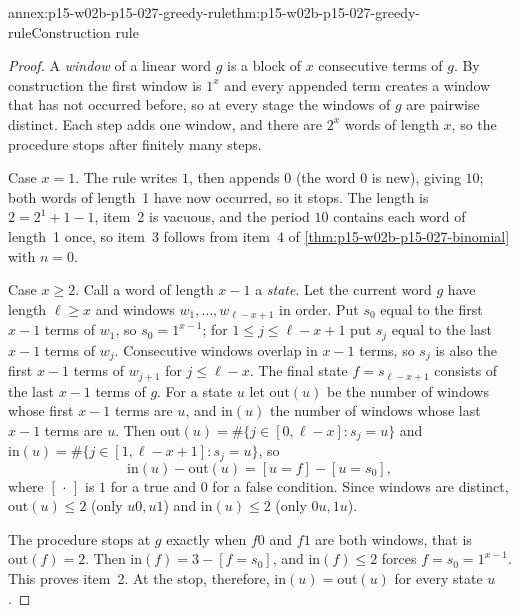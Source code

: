 \begin{annexitem}{annex:p15-w02b-p15-027-greedy-rule}{thm:p15-w02b-p15-027-greedy-rule}{Construction rule}
\begin{proof}
A \emph{window} of a linear word \(g\) is a block of \(x\) consecutive
terms of \(g\). By construction the first window is \(1^x\) and every
appended term creates a window that has not occurred before, so at every
stage the windows of \(g\) are pairwise distinct. Each step adds one
window, and there are \(2^x\) words of length \(x\), so the procedure
stops after finitely many steps.

Case \(x=1\). The rule writes \(1\), then appends \(0\) (the word \(0\)
is new), giving \(10\); both words of length~1 have now occurred, so it
stops. The length is \(2=2^1+1-1\), item~2 is vacuous, and the period
\(10\) contains each word of length~1 once, so item~3 follows from
item~4 of \cref{thm:p15-w02b-p15-027-binomial} with \(n=0\).

Case \(x\geq2\). Call a word of length \(x-1\) a \emph{state}. Let the
current word \(g\) have length \(\ell\geq x\) and windows
\(w_1,\ldots,w_{\ell-x+1}\) in order. Put \(s_0\) equal to the first
\(x-1\) terms of \(w_1\), so \(s_0=1^{x-1}\); for
\(1\leq j\leq\ell-x+1\) put \(s_j\) equal to the last \(x-1\) terms of
\(w_j\). Consecutive windows overlap in \(x-1\) terms, so \(s_j\) is
also the first \(x-1\) terms of \(w_{j+1}\) for \(j\leq\ell-x\). The
final state \(f=s_{\ell-x+1}\) consists of the last \(x-1\) terms of
\(g\). For a state \(u\) let \(\mathrm{out}(u)\) be the number of windows
whose first \(x-1\) terms are \(u\), and \(\mathrm{in}(u)\) the number of
windows whose last \(x-1\) terms are \(u\). Then
\(\mathrm{out}(u)=\#\{j\in[0,\ell-x]:s_j=u\}\) and
\(\mathrm{in}(u)=\#\{j\in[1,\ell-x+1]:s_j=u\}\), so
\[
 \mathrm{in}(u)-\mathrm{out}(u)=[u=f]-[u=s_0],
\]
where \([\,\cdot\,]\) is \(1\) for a true and \(0\) for a false condition.
Since windows are distinct, \(\mathrm{out}(u)\leq2\) (only \(u0,u1\)) and
\(\mathrm{in}(u)\leq2\) (only \(0u,1u\)).

The procedure stops at \(g\) exactly when \(f0\) and \(f1\) are both
windows, that is \(\mathrm{out}(f)=2\). Then
\(\mathrm{in}(f)=3-[f=s_0]\), and \(\mathrm{in}(f)\leq2\) forces
\(f=s_0=1^{x-1}\). This proves item~2. At the stop, therefore,
\(\mathrm{in}(u)=\mathrm{out}(u)\) for every state \(u\).


\end{proof}
\end{annexitem}

